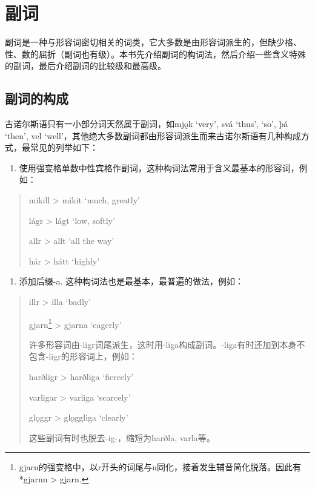 \section{副词}\label{副词}

副词是一种与形容词密切相关的词类，它大多数是由形容词派生的，但缺少格、性、数的屈折（副词也有级）。本书先介绍副词的构词法，然后介绍一些含义特殊的副词，最后介绍副词的比较级和最高级。

\subsection{副词的构成}\label{副词的构成}

古诺尔斯语只有一小部分词天然属于副词，如mjǫk `very', svá `thus', `so',
þá `then', vel
`well'，其他绝大多数副词都由形容词派生而来古诺尔斯语有几种构成方式，最常见的列举如下：

\begin{enumerate}
  \def\labelenumi{\arabic{enumi})}
  \item
        使用强变格单数中性宾格作副词，这种构词法常用于含义最基本的形容词，例如：
\end{enumerate}

\begin{quote}
  mikill \textgreater{} mikit `much, greatly‌'

  lágr \textgreater{} lágt `low, softly‌'

  allr \textgreater{} allt `all the way‌'

  hár \textgreater{} hátt `highly‌'
\end{quote}

\begin{enumerate}
  \def\labelenumi{\arabic{enumi})}
  \setcounter{enumi}{1}
  \item
        添加后缀-a. 这种构词法也是最基本，最普遍的做法，例如：
\end{enumerate}

\begin{quote}
  illr \textgreater{} illa `badly‌'

  gjarn\footnote{gjarn的强变格中，以r开头的词尾与n同化，接着发生辅音简化脱落。因此有*gjarnn
    \textgreater{} gjarn.} \textgreater{} gjarna `eagerly‌'

  许多形容词由-ligr词尾派生，这时用-liga构成副词。-liga有时还加到本身不包含-ligr的形容词上，例如：

  harðligr \textgreater{} harðliga `fiercely‌'

  varligar \textgreater{} varliga `scarcely‌'

  glǫggr \textgreater{} glǫggliga `clearly'

  这些副词有时也脱去-ig-，缩短为harðla, varla等。
\end{quote}

